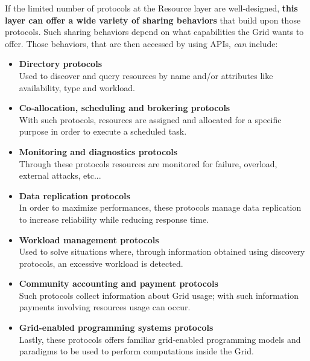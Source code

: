 If the limited number of protocols at the Resource layer are well-designed, \textbf{this layer can offer a wide variety of sharing behaviors} that build upon those protocols. Such sharing behaviors depend on what capabilities the Grid wants to offer. Those behaviors, that are then accessed by using APIs, \textit{can} include:
\begin{itemize}
    \item \textbf{Directory protocols}\\
    Used to discover and query resources by name and/or attributes like availability, type and workload.
    \item \textbf{Co-allocation, scheduling and brokering protocols}\\
    With such protocols, resources are assigned and allocated for a specific purpose in order to execute a scheduled task.
    \item \textbf{Monitoring and diagnostics protocols}\\
    Through these protocols resources are monitored for failure, overload, external attacks, etc...
    \item \textbf{Data replication protocols}\\
    In order to maximize performances, these protocols manage data replication to increase reliability while reducing response time.
    \item \textbf{Workload management protocols}\\
    Used to solve situations where, through information obtained using discovery protocols, an excessive workload is detected.
    \item \textbf{Community accounting and payment protocols}\\
    Such protocols collect information about Grid usage; with such information payments involving resources usage can occur.
    \item \textbf{Grid-enabled programming systems protocols}\\
    Lastly, these protocols offers familiar grid-enabled programming models and paradigms to be used to perform computations inside the Grid. 
\end{itemize}

